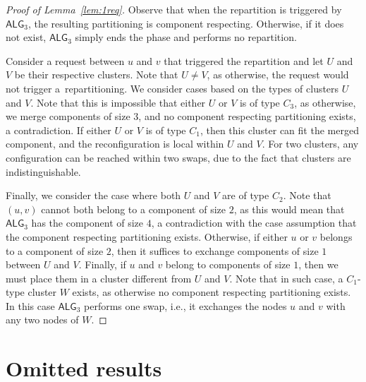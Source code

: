 \documentclass[manuscript,screen=true, review, anonymous]{acmart}
\newcommand{\TAlg}{{\ensuremath{\textsf{ALG}_{3}}}\xspace}
\begin{document}
\begin{proof}[Proof of Lemma~\ref{lem:1req}]
  Observe that when the repartition is triggered by \TAlg, the resulting partitioning is component respecting.
  Otherwise, if it does not exist, \TAlg simply ends the phase and performs no repartition.

  
    Consider a request between $u$ and $v$ that triggered the repartition and let $U$ and $V$ be their respective clusters.
    Note that $U\neq V$,
	 as otherwise, the request would not trigger a~repartitioning.
	 We consider cases based on the types of clusters $U$ and $V$.
    Note that this is impossible that either $U$ or $V$ is of type $C_3$, as otherwise, we merge components of size $3$, and no component respecting partitioning exists, a contradiction.
    If either $U$ or $V$ is of type $C_1$, then this cluster can fit the merged component, and the reconfiguration is local within $U$ and $V$.
    For two clusters, any configuration can be reached within two swaps, due to the fact that clusters are indistinguishable.
  
    Finally, we consider the case where both $U$ and $V$ are of type $C_2$. Note that $(u,v)$ cannot both belong to a component of size $2$, as this would mean that \TAlg has the component of size $4$, a contradiction with the case assumption that the component respecting partitioning exists. 
    Otherwise, if either $u$ or $v$ belongs to a component of size $2$, then it suffices to exchange components of size $1$ between $U$ and $V$.
    Finally, if $u$ and $v$ belong to components of size $1$, then we must place them in a cluster different from $U$ and $V$.
    Note that in such case, a $C_1$-type cluster $W$ exists, as otherwise no component respecting partitioning exists. In this case \TAlg performs one swap, i.e., it exchanges the nodes $u$ and $v$ with any two nodes of $W$.
\end{proof}

\section{Omitted results}
\end{document}
